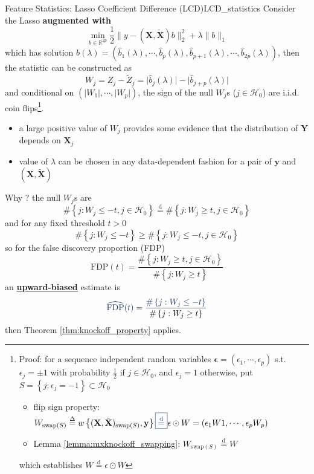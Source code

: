 \documentclass[twoside]{article}
\begin{document}
\begin{lemma}{Feature Statistics: Lasso Coefficient Difference (LCD)}{LCD_statistics}
    Consider the Lasso \textbf{{augmented with }} 
    $$
    \min_{b\in\mathbb{R}^{2p}}\frac{1}{2}\lVert y - (\mathbf{X},\tilde{\mathbf{X}})b \rVert^2_2 + \lambda \lVert b \rVert _1
    $$
    which has solution $ \hat{b}(\lambda) = (\hat{b}_1(\lambda),\cdots,\hat{b}_p(\lambda),\hat{b}_{p+1}(\lambda),\cdots,\hat{b}_{2p}(\lambda)) $, then the statistic can be constructed as 
    $$
    W_j = Z_j -\tilde{Z}_j = \lvert \hat{b}_j(\lambda) \rvert - \lvert \hat{b}_{j+p}(\lambda) \rvert
    $$
    and conditional on $\left( \lvert W_1 \rvert,\cdots, \lvert W_p \rvert \right)$, the sign of the null $W_j$s ($j\in \mathcal{H}_0$) are i.i.d. coin flips\footnote{Proof: for a sequence independent random variables $\boldsymbol{\epsilon}=(\epsilon_1,\cdots,\epsilon_p)$ s.t. $\epsilon_j = \pm 1$ with probability $\frac{1}{2}$ if $j\in\mathcal{H}_0$, and $\epsilon_j=1$ otherwise, put $S=\left\{j:\epsilon_j=-1\right\}\subset \mathcal{H}_0$
    \begin{itemize}
        \item flip sign property: $W_{\mathrm{swap}(S)} \overset{\Delta}{=}w \left\{ (\mathbf{X},\tilde{\mathbf{X}})_{\mathrm{swap}(S)},\mathbf{y} \right\} \textcolor{myblue}{\boxed{\overset{\mathrm{d}}{=}}} \epsilon \odot W = (\epsilon_1W1,\cdots,\epsilon_pW_p)$
        \item Lemma \ref{lemma:mxknockoff_swapping}: $W_{\mathrm{swap}(S)}\overset{\mathrm{d}}{=} W$
    \end{itemize}
    which establishes $W \overset{\mathrm{d}}{=} \epsilon \odot W $ }.
\end{lemma}
\begin{itemize}
    \item a large positive value of $W_j$ provides some evidence that the distribution of $\mathbf{Y}$ depends on $\mathbf{X}_j$
    \item value of $\lambda$ can be chosen in any data-dependent fashion for a pair of $\mathbf{y}$ and $(\mathbf{X},\tilde{\mathbf{X}})$ 
\end{itemize}

Why ? the null $W_j$s are 
$$
 \# \left\{ j: W_j\leq -t,j\in\mathcal{H}_0  \right\} \overset{\mathrm{d}}{=} \# \left\{ j: W_j\geq t,j\in\mathcal{H}_0  \right\}
$$
and for any fixed threshold $t>0$
$$
\# \left\{ j:W_j\leq -t \right\} \geq \# \left\{ j: W_j\leq -t,j\in\mathcal{H}_0  \right\}
$$
so for the false discovery proportion (FDP)
$$
{\mathrm{FDP}(t)} = \frac{ {\#\left\{j: W_j\geq t,j\in\mathcal{H}_0 \right\}} }{ \#\left\{ j:W_j\geq t \right\} }
$$
an \underline{\textbf{{upward-biased}}} estimate is
$$
{\textcolor{myblue}{\widehat{\mathrm{FDP}}(t)}} = \frac{ {\textcolor{myblue}{\# \left\{j: W_j\leq -t \right\}} } }{ \#\left\{ j:W_j\geq t \right\} }
$$
then Theorem \ref{thm:knockoff_property} applies.



\newpage


\end{document}
